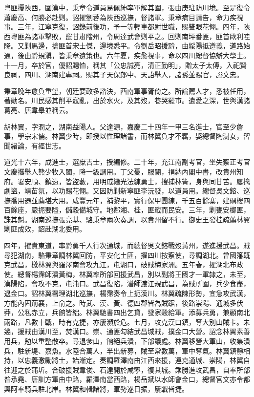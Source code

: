 \begin{pinyinscope}
粵匪擾陜西，圍漢中，秉章令道員易佩紳率軍解其圍，張由庚駐防川境。至是復令蕭慶高、何勝必赴剿。詔擢劉蓉為陜西巡撫，督諸軍。秉章病目請告，命力疾視事。三年，江寧克復，詔錄前後功，予一等輕車都尉世職，賜雙眼花翎。四年，陜西粵匪為諸軍擊敗，竄甘肅階州，令周達武會剿平之。回剿南坪番匪，匪首歐利哇降。又剿馬邊，擒匪首宋士傑，邊境悉平。令劉岳昭援黔，由綏陽抵遵義，道路始通，後由黔規滇，皆秉章遺策也。六年夏，疾愈視事，命以四川總督協辦大學士。十一月，卒於官，優詔賜恤，稱其「公忠誠亮，清正勤明」，贈太子太傅，入祀賢良祠，四川、湖南建專祠。賜其子天保郎中、天詒舉人，諸孫並賜官，謚文忠。

秉章晚年愈負重望，朝廷要政多諮決，西南軍事胥倚之。所論薦人才，悉被任用，著勛名。川民感其削平寇亂，出於水火，及其歿，巷哭罷市。遺愛之深，世與漢諸葛亮、唐韋皋並稱云。

胡林翼，字潤之，湖南益陽人。父達源，嘉慶二十四年一甲三名進士，官至少詹事，學宗宋儒。林翼少時，即授以性理諸書，而林翼負才不羈，娶總督陶澍女，習聞緒論，有經世志。

道光十六年，成進士，選庶吉士，授編修。二十年，充江南副考官，坐失察正考官文慶攜舉人熊少牧入闈，降一級調用。丁父憂，服闋，捐納內閣中書，改貴州知府。署安順、鎮遠，皆盜藪，用明戚繼光法練勇士，搜捕林箐，身與同甘苦。屢擒劇盜，靖苗氛，以功賜花翎。又因防剿新寧匪李沅發，以道員用。總督吳文鎔、巡撫喬用遷並薦堪大用。咸豐元年，補黎平，實行保甲團練，千五百餘寨，建碉樓四百餘座，嚴扼要隘，儲穀備城守。地鄰湘、桂，匪戢而民安。三年，剿甕安榔匪，誅其魁。湖南巡撫張亮基、駱秉章兩次奏調，以貴州留不行。御史王發桂疏薦林翼剿匪成效，詔赴湖北委用。

四年，擢貴東道，率黔勇千人行次通城，而總督吳文鎔戰歿黃州，遂進援武昌。賊尋犯湖南，駱秉章調林翼回防，平安化土匪，擢四川按察使，尋調湖北。曾國籓既克武昌，檄林翼與羅澤南會攻九江，屯湖口，破賊梅家洲。五年春，擢湖北布政使。總督楊霈師潰黃梅，林翼率所部回援武昌，別以副將王國才一軍隸之，未至，漢陽陷，會攻不克，屯沌口。武昌復陷，潛師渡江規武昌，為賊所圍，兵少食盡，退金口。詔林翼署理湖北巡撫，楊霈奏令上扼漢川。林翼疏陳形勢，宜急攻武漢，方能內固荊襄，上俞之。時武、漢、黃、德四郡皆為賊踞，後路崇陽、通城多伏莽，公私赤立，兵餉皆絀。林翼馳書四出乞貸，發家穀給軍。添募兵勇，兼顧南北兩路，凡數十戰，時有克捷，亦屢瀕於危。七月，攻克漢口鎮，奪大別山賊卡。未幾，援賊由漢川至，焚漢口。崇、通匪勾結武昌城賊，撲金口大營。詔念林翼素善用兵，勉以重整散卒。尋退奓山，餉絕兵潰，下部議處。林翼移營大軍山，收集潰兵，駐新堤、嘉魚。水陸合萬人，半出新募，賊至常數萬，軍中奪氣。林翼鎮靜相持，以忠義激勵將士，始漸定。奏調羅澤南由江西來援，連克通城、崇陽，林翼自往迎之於蒲圻。合破援賊韋俊、石達開於咸寧，復其城。乘勝進攻武昌，自率所部普承堯、唐訓方軍由中路，羅澤南當西路，楊岳斌以水師會金口，總督官文亦令都興阿率騎兵駐北岸。林翼和輯諸將，軍勢遂日振，屢戰皆捷。


\end{pinyinscope}
